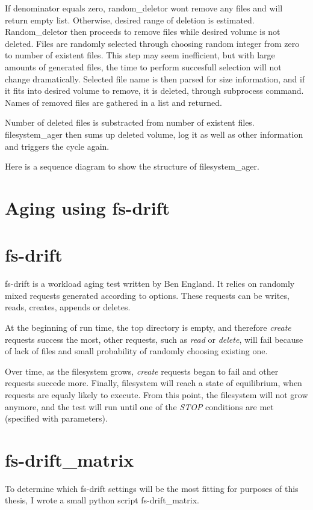 \documentclass[
  color, %
  table, %
  lof,   %
  lot,   %
]{fithesis3}
\begin{document}
If denominator equals zero, random\_deletor wont remove any files and will return empty list. Otherwise, desired range of deletion is estimated. Random\_deletor then proceeds to remove files while desired volume is not deleted. Files are randomly selected through choosing random integer from zero to number of existent files. This step may seem inefficient, but with large amounts of generated files, the time to perform succesfull selection will not change dramatically. Selected file name is then parsed for size information, and if it fits into desired volume to remove, it is deleted, through subprocess command. Names of removed files are gathered in a list and returned.

Number of deleted files is substracted from number of existent files.
filesystem\_ager then sums up deleted volume, log it as well as other information and triggers the cycle again.

Here is a sequence diagram to show the structure of filesystem\_ager.

\section{Aging using fs-drift}
\section{fs-drift}
fs-drift is a workload aging test written by Ben England. It relies on randomly mixed requests generated according to options. These requests can be writes, reads, creates, appends or deletes.

At the beginning of run time, the top directory is empty, and therefore \textit{create} requests success the most, other requests, such as \textit{read} or \textit{delete}, will fail because of lack of files and small probability of randomly choosing existing one. 

Over time, as the filesystem grows, \textit{create} requests began to fail and other requests succede more. Finally, filesystem will reach a state of equilibrium, when requests are equaly likely to execute. From this point, the filesystem will not grow anymore, and the test will run until one of the \textit{STOP} conditions are met (specified with parameters).

\section{fs-drift\_matrix}
To determine which fs-drift settings will be the most fitting for purposes of this thesis, I wrote a small python script fs-drift\_matrix.
\end{document}
